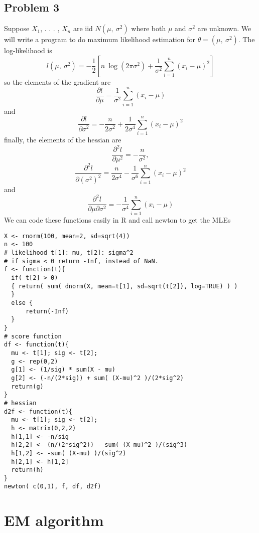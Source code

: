 \documentclass[12pt]{article}
\begin{document}
\subsection*{Problem 3}
Suppose $X_{1}$, . . . , $X_{n}$ are iid $N(\mu,\ \sigma^{2})$ where both $\mu$ and $\sigma^{2}$ are unknown. We will write a program to do maximum likelihood estimation for $\theta=(\mu,\ \sigma^{2})$. The log-likelihood is
$$
l(\mu,\ \sigma^{2})=-\frac{1}{2}[n\ \log(2\pi\sigma^{2})+\frac{1}{\sigma^{2}}\sum_{i=1}^{n}(x_{i}-\mu)^{2}]
$$
so the elements of the gradient are
$$
\frac{\partial l}{\partial\mu}=\frac{1}{\sigma^{2}}\sum_{i=1}^{n}(x_{i}-\mu)
$$
and
$$
\frac{\partial l}{\partial\sigma^{2}}=-\frac{n}{2\sigma^{2}}+\frac{1}{2\sigma^{4}}\sum_{i=1}^{n}(x_{i}-\mu)^{2}
$$
finally, the elements of the hessian are
$$
\frac{\partial^{2}l}{\partial\mu^{2}}=-\frac{n}{\sigma^{2}},
$$
$$
\frac{\partial^{2}l}{\partial(\sigma^{2})^{2}}=\frac{n}{2\sigma^{4}}-\frac{1}{\sigma^{6}}\sum_{i=1}^{n}(x_{i}-\mu)^{2}
$$
and
$$
\frac{\partial^{2}l}{\partial\mu\partial\sigma^{2}}=-\frac{1}{\sigma^{4}}\sum_{i=1}^{n}(x_{i}-\mu)
$$
We can code these functions easily in $\mathrm{R}$ and call newton to get the MLEs
\begin{verbatim}
X <- rnorm(100, mean=2, sd=sqrt(4))
n <- 100
# likelihood t[1]: mu, t[2]: sigma^2
# if sigma < 0 return -Inf, instead of NaN.
f <- function(t){
  if( t[2] > 0)
  { return( sum( dnorm(X, mean=t[1], sd=sqrt(t[2]), log=TRUE) ) )
  } 
  else {
	  return(-Inf)
  }
}
# score function
df <- function(t){
  mu <- t[1]; sig <- t[2];
  g <- rep(0,2)
  g[1] <- (1/sig) * sum(X - mu)
  g[2] <- (-n/(2*sig)) + sum( (X-mu)^2 )/(2*sig^2)
  return(g)
}
# hessian
d2f <- function(t){
  mu <- t[1]; sig <- t[2];
  h <- matrix(0,2,2)
  h[1,1] <- -n/sig
  h[2,2] <- (n/(2*sig^2)) - sum( (X-mu)^2 )/(sig^3)
  h[1,2] <- -sum( (X-mu) )/(sig^2)
  h[2,1] <- h[1,2]
  return(h)
}
newton( c(0,1), f, df, d2f)

\end{verbatim}


\section{EM algorithm}
\end{document}
